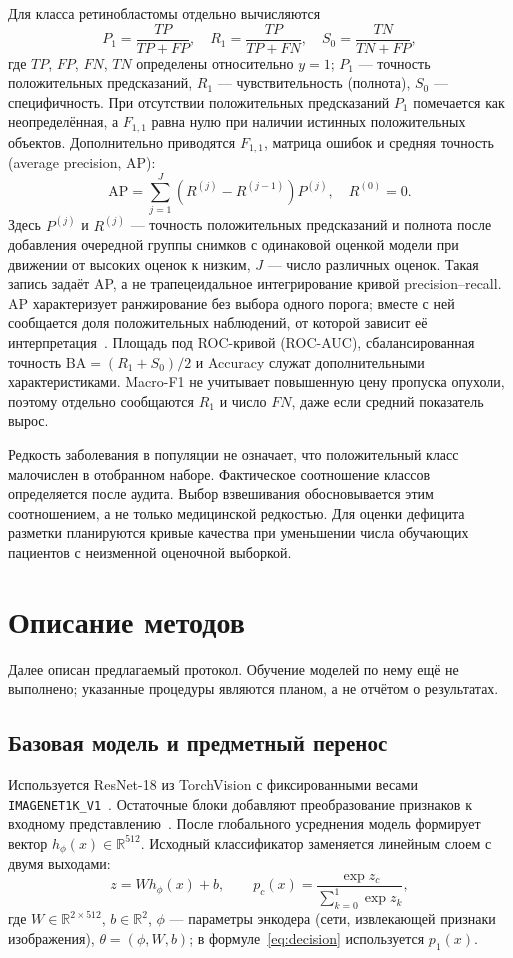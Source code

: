 \documentclass{misisarticle}
\begin{document}
Для класса ретинобластомы отдельно вычисляются
\begin{equation}
 P_1=\frac{TP}{TP+FP},\quad
 R_1=\frac{TP}{TP+FN},\quad
 S_0=\frac{TN}{TN+FP},
 \label{eq:pr}
\end{equation}
где $TP$, $FP$, $FN$, $TN$ определены относительно $y=1$; $P_1$ --- точность положительных предсказаний, $R_1$ --- чувствительность (полнота), $S_0$ --- специфичность. При отсутствии положительных предсказаний $P_1$ помечается как неопределённая, а $F_{1,1}$ равна нулю при наличии истинных положительных объектов. Дополнительно приводятся $F_{1,1}$, матрица ошибок и средняя точность (average precision, AP):
\begin{equation}
 \mathrm{AP}=\sum_{j=1}^{J}(R^{(j)}-R^{(j-1)})P^{(j)},\quad R^{(0)}=0.
 \label{eq:ap}
\end{equation}
Здесь $P^{(j)}$ и $R^{(j)}$ --- точность положительных предсказаний и полнота после добавления очередной группы снимков с одинаковой оценкой модели при движении от высоких оценок к низким, $J$ --- число различных оценок. Такая запись задаёт AP, а не трапецеидальное интегрирование кривой precision--recall. AP характеризует ранжирование без выбора одного порога; вместе с ней сообщается доля положительных наблюдений, от которой зависит её интерпретация~\cite{apdocs}. Площадь под ROC-кривой (ROC-AUC), сбалансированная точность $\mathrm{BA}=(R_1+S_0)/2$ и Accuracy служат дополнительными характеристиками. Macro-F1 не учитывает повышенную цену пропуска опухоли, поэтому отдельно сообщаются $R_1$ и число $FN$, даже если средний показатель вырос.

Редкость заболевания в популяции не означает, что положительный класс малочислен в отобранном наборе. Фактическое соотношение классов определяется после аудита. Выбор взвешивания обосновывается этим соотношением, а не только медицинской редкостью. Для оценки дефицита разметки планируются кривые качества при уменьшении числа обучающих пациентов с неизменной оценочной выборкой.

\section{Описание методов}
Далее описан предлагаемый протокол. Обучение моделей по нему ещё не выполнено; указанные процедуры являются планом, а не отчётом о результатах.
\subsection{Базовая модель и предметный перенос}
Используется ResNet-18 из TorchVision с фиксированными весами \texttt{IMAGENET1K\_V1}~\cite{torchvision}. Остаточные блоки добавляют преобразование признаков к входному представлению~\cite{resnet}. После глобального усреднения модель формирует вектор $h_\phi(x)\in\mathbb R^{512}$. Исходный классификатор заменяется линейным слоем с двумя выходами:
\begin{equation}
 z=Wh_\phi(x)+b,\qquad
 p_c(x)=\frac{\exp z_c}{\sum_{k=0}^{1}\exp z_k},
 \label{eq:head}
\end{equation}
где $W\in\mathbb R^{2\times512}$, $b\in\mathbb R^2$, $\phi$ --- параметры энкодера (сети, извлекающей признаки изображения), $\theta=(\phi,W,b)$; в формуле~\eqref{eq:decision} используется $p_1(x)$.
\end{document}
